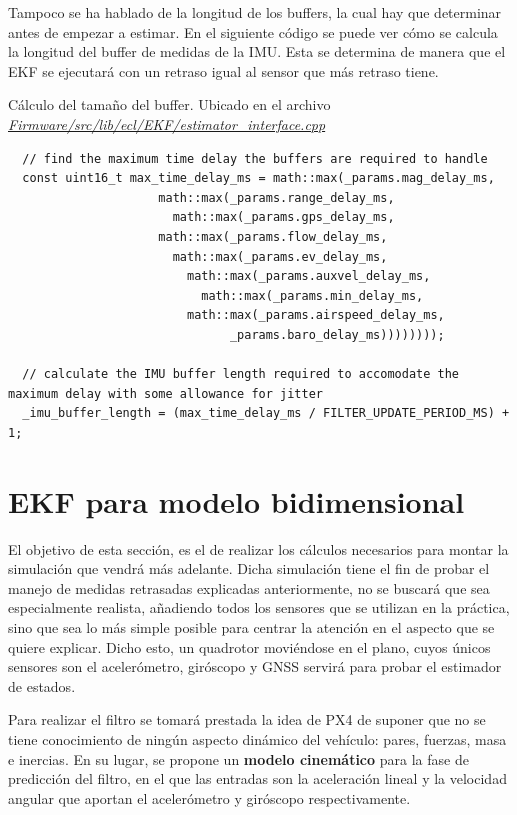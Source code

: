 
Tampoco se ha hablado de la longitud de los buffers, la cual hay que determinar antes de empezar a estimar. En el siguiente código se puede ver cómo se calcula la longitud del buffer de medidas de la IMU. Esta se determina de manera que el EKF se ejecutará con un retraso igual al sensor que más retraso tiene.
\begin{codigo}{Cálculo del tamaño del buffer. Ubicado en el archivo \href{https://github.com/PX4/PX4-ECL/blob/ec934908900b23ee273d1a9f82364b7b38423200/EKF/estimator_interface.cpp\#L513}{\textit{Firmware/src/lib/ecl/EKF/estimator\_interface.cpp}}}
\begin{verbatim}
  // find the maximum time delay the buffers are required to handle
  const uint16_t max_time_delay_ms = math::max(_params.mag_delay_ms,
  				     math::max(_params.range_delay_ms,
  				       math::max(_params.gps_delay_ms,
  					 math::max(_params.flow_delay_ms,
  					   math::max(_params.ev_delay_ms,
  					     math::max(_params.auxvel_delay_ms,
  					       math::max(_params.min_delay_ms,
  						 math::max(_params.airspeed_delay_ms,
  						       _params.baro_delay_ms))))))));
  
  // calculate the IMU buffer length required to accomodate the maximum delay with some allowance for jitter
  _imu_buffer_length = (max_time_delay_ms / FILTER_UPDATE_PERIOD_MS) + 1;
\end{verbatim}
\end{codigo} 


\section{EKF para modelo bidimensional}
El objetivo de esta sección, es el de realizar los cálculos necesarios para montar la simulación que vendrá más adelante. Dicha simulación tiene el fin de probar el manejo de medidas retrasadas explicadas anteriormente, no se buscará que sea especialmente realista, añadiendo todos los sensores que se utilizan en la práctica, sino que sea lo más simple posible para centrar la atención en el aspecto que se quiere explicar. Dicho esto, un quadrotor moviéndose en el plano, cuyos únicos sensores son el acelerómetro, giróscopo y GNSS servirá para probar el estimador de estados. 

Para realizar el filtro se tomará prestada la idea de PX4 de suponer que no se tiene conocimiento de ningún aspecto dinámico del vehículo: pares, fuerzas, masa e inercias. En su lugar, se propone un \textbf{modelo cinemático} para la fase de predicción del filtro, en el que las entradas son la aceleración lineal y la velocidad angular que aportan el acelerómetro y giróscopo respectivamente.

